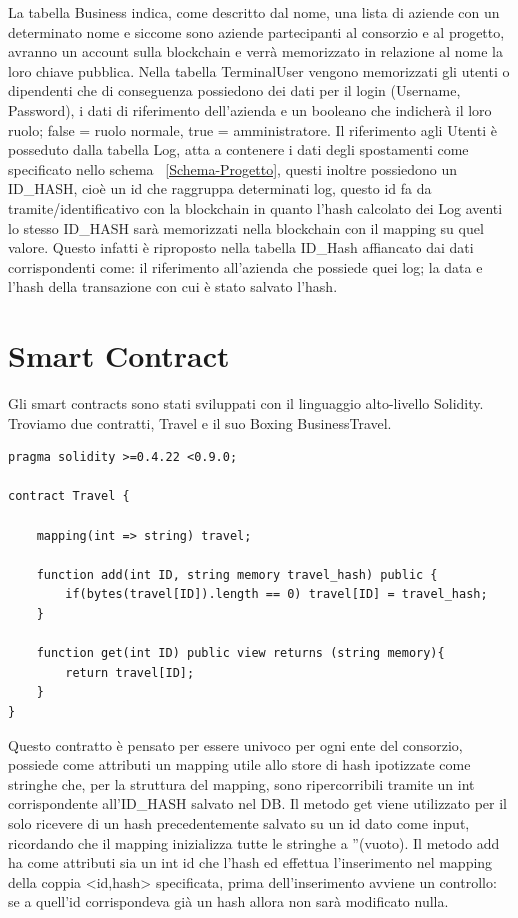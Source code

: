 \documentclass[11pt,a4paper,titlepage,twoside,openright]{report}
\begin{document}
La tabella Business indica, come descritto dal nome, una lista di aziende con un determinato nome e siccome sono aziende partecipanti al consorzio e al progetto, avranno un account sulla blockchain e verrà memorizzato in relazione al nome la loro chiave pubblica. Nella tabella TerminalUser vengono memorizzati gli utenti o dipendenti che di conseguenza possiedono dei dati per il login (Username, Password), i dati di riferimento dell'azienda e un booleano che indicherà il loro ruolo; false = ruolo normale, true = amministratore. Il riferimento agli Utenti è posseduto dalla tabella Log, atta a contenere i dati degli spostamenti  come specificato nello schema ~\ref{Schema-Progetto}, questi inoltre possiedono un ID\_HASH, cioè un id che raggruppa determinati log, questo id fa da tramite/identificativo con la blockchain in quanto l'hash calcolato dei Log aventi lo stesso ID\_HASH sarà memorizzati nella blockchain con il mapping su quel valore. Questo infatti è riproposto nella tabella ID\_Hash affiancato dai dati corrispondenti come: il riferimento all'azienda che possiede quei log; la data e l'hash della transazione con cui è stato salvato l'hash.

\section{Smart Contract}
Gli smart contracts sono stati sviluppati con il linguaggio alto-livello Solidity. Troviamo due contratti, Travel e il suo Boxing BusinessTravel.
\begin{lstlisting}[language=Solidity]
pragma solidity >=0.4.22 <0.9.0;

contract Travel {

    mapping(int => string) travel;

    function add(int ID, string memory travel_hash) public {
        if(bytes(travel[ID]).length == 0) travel[ID] = travel_hash;
    }

    function get(int ID) public view returns (string memory){
        return travel[ID];
    }
}
\end{lstlisting}
Questo contratto è pensato per essere univoco per ogni ente del consorzio, possiede come attributi un mapping utile allo store di hash ipotizzate come stringhe che, per la struttura del mapping, sono ripercorribili tramite un int corrispondente all'ID\_HASH salvato nel DB. Il metodo get viene utilizzato per il solo ricevere di un hash precedentemente salvato su un id dato come input, ricordando che il mapping inizializza tutte le stringhe a ''(vuoto). Il metodo add ha come attributi sia un int id che l'hash ed effettua l'inserimento nel mapping della coppia <id,hash> specificata, prima dell'inserimento avviene un controllo: se a quell'id corrispondeva già un hash allora non sarà modificato nulla. 
\end{document}
